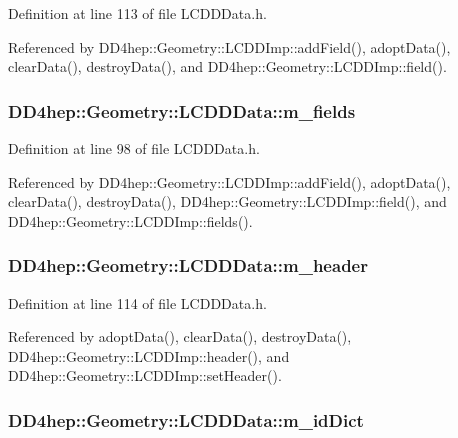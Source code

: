 Definition at line 113 of file LCDDData.h.

Referenced by DD4hep::Geometry::LCDDImp::addField(), adoptData(), clearData(), destroyData(), and DD4hep::Geometry::LCDDImp::field().\hypertarget{class_d_d4hep_1_1_geometry_1_1_l_c_d_d_data_a16e560764499fe2e5756b9317fcccacd}{
\subsubsection[{m\_\-fields}]{ {\bf DD4hep::Geometry::LCDDData::m\_\-fields}}}
\label{class_d_d4hep_1_1_geometry_1_1_l_c_d_d_data_a16e560764499fe2e5756b9317fcccacd}


Definition at line 98 of file LCDDData.h.

Referenced by DD4hep::Geometry::LCDDImp::addField(), adoptData(), clearData(), destroyData(), DD4hep::Geometry::LCDDImp::field(), and DD4hep::Geometry::LCDDImp::fields().\hypertarget{class_d_d4hep_1_1_geometry_1_1_l_c_d_d_data_a0df630bab0fd0325f35007d17dea2292}{
\subsubsection[{m\_\-header}]{ {\bf DD4hep::Geometry::LCDDData::m\_\-header}}}
\label{class_d_d4hep_1_1_geometry_1_1_l_c_d_d_data_a0df630bab0fd0325f35007d17dea2292}


Definition at line 114 of file LCDDData.h.

Referenced by adoptData(), clearData(), destroyData(), DD4hep::Geometry::LCDDImp::header(), and DD4hep::Geometry::LCDDImp::setHeader().\hypertarget{class_d_d4hep_1_1_geometry_1_1_l_c_d_d_data_acf98a251987f065777c7c1ae87c9a36b}{
\subsubsection[{m\_\-idDict}]{ {\bf DD4hep::Geometry::LCDDData::m\_\-idDict}}}
\label{class_d_d4hep_1_1_geometry_1_1_l_c_d_d_data_acf98a251987f065777c7c1ae87c9a36b}


